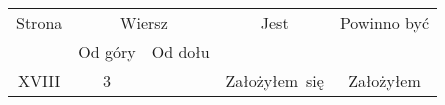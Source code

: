 \documentclass[a4paper,11pt]{article}
\numberwithin{equation}{section}
\begin{document}
\newpage



\begin{center}

  \begin{tabular}{|c|c|c|c|c|}
    \hline
    Strona & \multicolumn{2}{c|}{Wiersz} & Jest
    & Powinno być \\ \cline{2-3}
    & Od góry & Od dołu & & \\
    \hline
    XVIII & 3 & & Założyłem~się & Założyłem \\
    \hline
  \end{tabular}

\end{center}

\VerSpaceTwo


\noindent












\printbibliography





\end{document}
